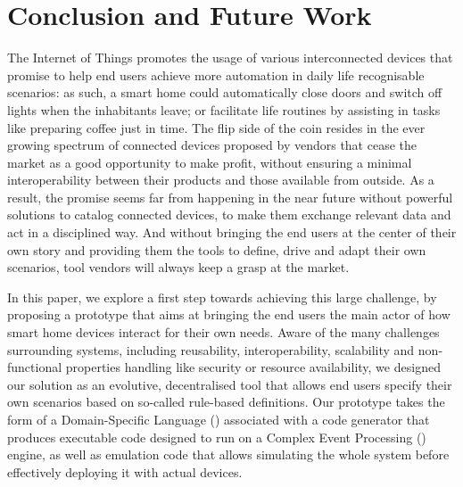 \section{Conclusion and Future Work}
\label{sec:Conclusion}

The Internet of Things promotes the usage of various interconnected devices that promise to help end users achieve more automation in daily life recognisable scenarios: as such, a smart home could automatically close doors and switch off lights when the inhabitants leave; or facilitate life routines by assisting in tasks like preparing coffee just in time. The flip side of the coin resides in the ever growing spectrum of connected devices proposed by vendors that cease the market as a good opportunity to make profit, without ensuring a minimal interoperability between their products and those available from outside. As a result, the promise seems far from happening in the near future without powerful solutions to catalog connected devices, to make them exchange relevant data and act in a disciplined way. And without bringing the end users at the center of their own story and providing them the tools to define, drive and adapt their own scenarios, tool vendors will always keep a grasp at the \IOT market.

In this paper, we explore a first step towards achieving this large challenge, by proposing a prototype that aims at bringing the end users the main actor of how smart home devices interact for their own needs. Aware of the many challenges surrounding \IOT systems, including reusability, interoperability, scalability and non-functional properties handling like security or resource availability, we designed our solution as an evolutive, decentralised tool that allows end users specify their own scenarios based on so-called rule-based definitions. Our prototype takes the form of a Domain-Specific Language (\DSL) associated with a code generator that produces executable code designed to run on a Complex Event Processing (\CEP) engine, as well as emulation code that allows simulating the whole system before effectively deploying it with actual devices. 


